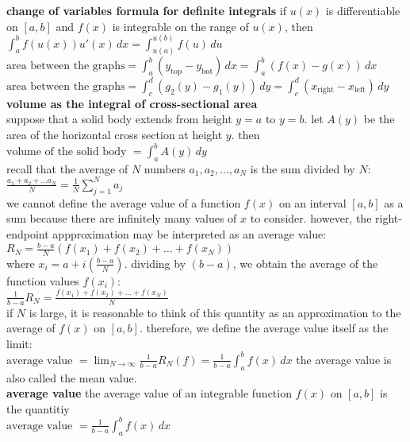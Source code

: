 \documentclass{article}
\begin{document}
\textbf{change of variables formula for definite integrals} if $u(x)$ is differentiable on $[a, b]$ and $f(x)$ is integrable on the range of $u(x)$, then\\
$\int_{a}^{b}f(u(x))u'(x)\,dx = \int_{u(a)}^{u(b)}f(u)\,du$\\

$\text{area between the graphs} = \int_{a}^{b}(y_{\text{top}} - y_{\text{bot}})\,dx = \int_{a}^{b}(f(x) - g(x))\,dx$\\

$\text{area between the graphs} = \int_{c}^{d}(g_2(y) - g_1(y))\,dy = \int_{c}^{d}(x_{\text{right}} - x_{\text{left}})\,dy$\\

\textbf{volume as the integral of cross-sectional area}\\
suppose that a solid body extends from height $y = a$ to $y = b$. let $A(y)$ be the area of the horizontal cross section at height $y$. then\\ $\text{volume of the solid body } = \int_{a}^{b}A(y)\,dy$\\

recall that the average of $N$ numbers $a_1, a_2, \ldots, a_N$ is the sum divided by $N$:\\ $\frac{a_1 + a_2 + \ldots a_N}{N} = \frac{1}{N}\sum_{j=1}^{N}a_j$\\ we cannot define the average value of a function $f(x)$ on an interval $[a, b]$ as a sum because there are infinitely many values of $x$ to consider. however, the right-endpoint appproximation may be interpreted as an average value:\\ $R_N = \frac{b - a}{N}(f(x_1) + f(x_2) + \ldots + f(x_N))$\\ where $x_i = a + i(\frac{b - a}{N})$. dividing by $(b - a)$, we obtain the average of the function values $f(x_i)$:\\ $\frac{1}{b - a}R_N = \frac{f(x_1) + f(x_2) + \ldots + f(x_N)}{N}$\\ if $N$ is large, it is reasonable to think of this quantity as an approximation to the average of $f(x)$ on $[a, b]$. therefore, we define the average value itself as the limit:\\ $\text{average value } = \lim_{N \to \infty}\frac{1}{b - a}R_N(f) = \frac{1}{b - a}\int_{a}^{b}f(x)\,dx$ the average value is also called the mean value.\\

\textbf{average value} the average value of an integrable function $f(x)$ on $[a, b]$ is the quantitiy\\ $\text{average value } = \frac{1}{b - a}\int_{a}^{b}f(x)\,dx$\\
\end{document}
